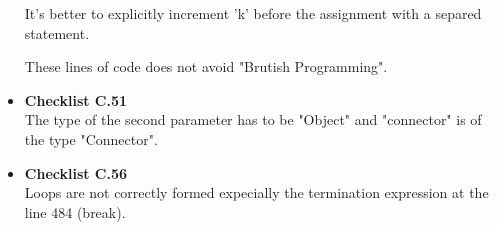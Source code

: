 \documentclass[../../../../codeInspection.tex]{subfiles}
\begin{document}
\begin{itemize}
		          It's better to explicitly increment 'k' before the assignment with a separed statement.

		          These lines of code does not avoid "Brutish Programming".

		    \item \textbf{Checklist C.51} \\

		    	  

		    	  The type of the second parameter has to be "Object" and "connector" is of the type "Connector".

		    \item \textbf{Checklist C.56} \\

		    	  

		    	  Loops are not correctly formed expecially the termination expression at the line 484 (break).

		\end{itemize}
\end{document}
